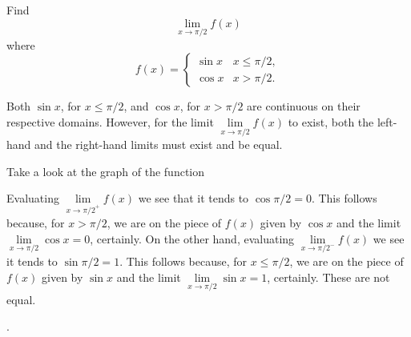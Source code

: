 \documentclass{ximera}
\begin{document}
\begin{question}
  Find 
  \[
  \displaystyle \lim_{x\to \pi/2} f(x)
  \]
  where
  \[
  f(x) = \left\{\begin{array}{cl} \sin x & x\leq \pi/2, \\ \cos x & x>\pi/2. \end{array}\right.
  \]
  \begin{solution}
    \begin{hint}
     Both $\sin x$, for $x\leq\pi/2$, and $\cos x$, for $x>\pi/2$ are continuous on their respective domains. However, for the limit $\lim\limits_{x\to\pi/2}f(x)$ to exist, both the left-hand and the right-hand limits must exist and be equal.
    \end{hint}
     \begin{hint}
    	Take a look at the graph of the function
    \begin{center}
      \end{center} 
    \end{hint}
    \begin{hint}
     Evaluating $\lim\limits_{x\to{\pi/2}^{+}}f(x)$ we see that it tends to $\cos \pi/2=0$. This follows because, for $x>\pi/2$, we are on the piece of $f(x)$ given by $\cos x$ and the limit $\lim\limits_{x\to{\pi/2}}\cos x=0$, certainly. On the other hand, evaluating $\lim\limits_{x\to{\pi/2}^{-}}f(x)$ we see it tends to $\sin \pi/2=1$. This follows because, for $x\leq\pi/2$, we are on the piece of $f(x)$ given by $\sin x$ and the limit $\lim\limits_{x\to\pi/2}\sin x=1$, certainly. These are not equal.
    \end{hint}
    .
  \end{solution}
\end{question}
\end{document}
